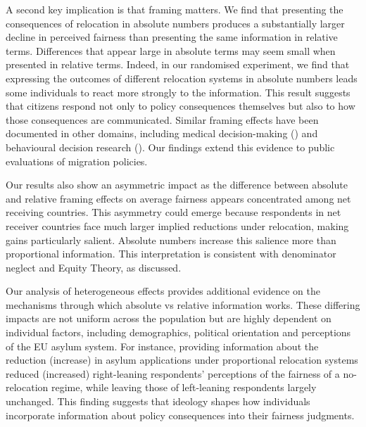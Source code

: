 \documentclass[
  12pt,
  a4paper,
]{article}
\begin{document}
A second key implication is that framing matters. We find that presenting the consequences of relocation in absolute numbers produces a substantially larger decline in perceived fairness than presenting the same information in relative terms. Differences that appear large in absolute terms may seem small when presented in relative terms. Indeed, in our randomised experiment, we find that expressing the outcomes of different relocation systems in absolute numbers leads some individuals to react more strongly to the information. This result suggests that citizens respond not only to policy consequences themselves but also to how those consequences are communicated. Similar framing effects have been documented in other domains, including medical decision-making () and behavioural decision research (). Our findings extend this evidence to public evaluations of migration policies.

Our results also show an asymmetric impact as the difference between absolute and relative framing effects on average fairness appears concentrated among net receiving countries. This asymmetry could emerge because respondents in net receiver countries face much larger implied reductions under relocation, making gains particularly salient. Absolute numbers increase this salience more than proportional information. This interpretation is consistent with denominator neglect and Equity Theory, as discussed.

Our analysis of heterogeneous effects provides additional evidence on the mechanisms through which absolute vs relative information works. These differing impacts are not uniform across the population but are highly dependent on individual factors, including demographics, political orientation and perceptions of the EU asylum system. For instance, providing information about the reduction (increase) in asylum applications under proportional relocation systems reduced (increased) right-leaning respondents' perceptions of the fairness of a no-relocation regime, while leaving those of left-leaning respondents largely unchanged. This finding suggests that ideology shapes how individuals incorporate information about policy consequences into their fairness judgments.
\end{document}
